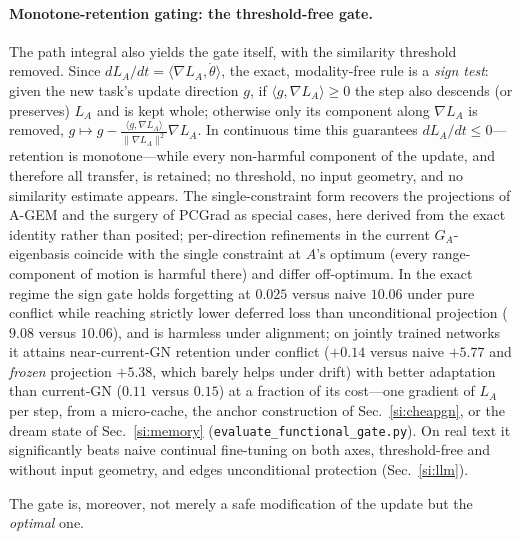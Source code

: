 \documentclass[10pt,a4paper]{article}
\theoremstyle{plain}
\theoremstyle{definition}
\begin{document}
\paragraph{Monotone-retention gating: the threshold-free gate.} The path integral also
yields the gate itself, with the similarity threshold removed. Since
$dL_A/dt=\langle\nabla L_A,\dot\theta\rangle$, the exact, modality-free rule is a
\emph{sign test}: given the new task's update direction $g$, if
$\langle g,\nabla L_A\rangle\ge0$ the step also descends (or preserves) $L_A$ and is kept
whole; otherwise only its component along $\nabla L_A$ is removed,
$g\mapsto g-\frac{\langle g,\nabla L_A\rangle}{\|\nabla L_A\|^2}\nabla L_A$. In continuous
time this guarantees $dL_A/dt\le0$---retention is monotone---while every non-harmful
component of the update, and therefore all transfer, is retained; no threshold, no input
geometry, and no similarity estimate appears. The single-constraint form recovers the
projections of A-GEM \cite{chaudhry2019} and the surgery of PCGrad \cite{yu2020pcgrad} as
special cases, here derived from the exact identity rather than posited; per-direction
refinements in the current $G_A$-eigenbasis coincide with the single constraint at $A$'s
optimum (every range-component of motion is harmful there) and differ off-optimum. In the
exact regime the sign gate holds forgetting at $0.025$ versus naive $10.06$ under pure
conflict while reaching strictly lower deferred loss than unconditional projection ($9.08$
versus $10.06$), and is harmless under alignment; on jointly trained networks it attains
near-current-GN retention under conflict ($+0.14$ versus naive $+5.77$ and \emph{frozen}
projection $+5.38$, which barely helps under drift) with better adaptation than
current-GN ($0.11$ versus $0.15$) at a fraction of its cost---one gradient of $L_A$ per
step, from a micro-cache, the anchor construction of Sec.~\ref{si:cheapgn}, or the dream
state of Sec.~\ref{si:memory} (\texttt{evaluate\_functional\_gate.py}). On real text it
significantly beats naive continual fine-tuning on both axes, threshold-free and without
input geometry, and edges unconditional protection (Sec.~\ref{si:llm}).

The gate is, moreover, not merely a safe modification of the update but the
\emph{optimal} one.
\end{document}

